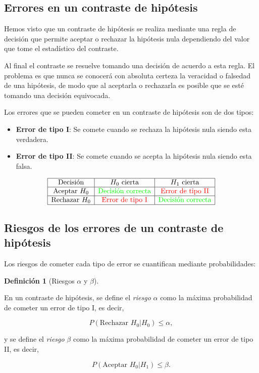 \documentclass[
  a4paper,
]{scrreport}
\theoremstyle{plain}
\theoremstyle{definition}
\theoremstyle{definition}
\newtheorem{definition}{Definición}[chapter]
\theoremstyle{remark}
\begin{document}
\subsection{Errores en un contraste de
hipótesis}\label{errores-en-un-contraste-de-hipuxf3tesis}

Hemos visto que un contraste de hipótesis se realiza mediante una regla
de decisión que permite aceptar o rechazar la hipótesis nula dependiendo
del valor que tome el estadístico del contraste.

Al final el contraste se resuelve tomando una decisión de acuerdo a esta
regla. El problema es que nunca se conocerá con absoluta certeza la
veracidad o falsedad de una hipótesis, de modo que al aceptarla o
rechazarla es posible que se esté tomando una decisión equivocada.

Los errores que se pueden cometer en un contraste de hipótesis son de
dos tipos:

\begin{itemize}
\item
  \textbf{Error de tipo I}: Se comete cuando se rechaza la hipótesis
  nula siendo esta verdadera.
\item
  \textbf{Error de tipo II}: Se comete cuando se acepta la hipótesis
  nula siendo esta falsa.
\end{itemize}

\[
\begin{array}{|c|c|c|}
\hline
\mbox{Decisión} & H_0 \mbox{ cierta} & H_1 \mbox{ cierta} \\
\hline
\mbox{Aceptar } H_0 & \color{green}{\mbox{Decisión correcta}} & \color{red}{\mbox{Error de tipo II}} \\
\hline
\mbox{Rechazar }H_0 & \color{red}{\mbox{Error de tipo I}} & \color{green}{\mbox{Decisión correcta}} \\
\hline
\end{array}
\]

\subsection{Riesgos de los errores de un contraste de
hipótesis}\label{riesgos-de-los-errores-de-un-contraste-de-hipuxf3tesis}

Los riesgos de cometer cada tipo de error se cuantifican mediante
probabilidades:

\begin{definition}[Riesgos \(\alpha\) y
\(\beta\)]\protect\hypertarget{def-riesgos-alfa-beta}{}\label{def-riesgos-alfa-beta}

En un contraste de hipótesis, se define el \emph{riesgo} \(\alpha\) como
la máxima probabilidad de cometer un error de tipo I, es decir,

\[
P(\mbox{Rechazar }H_0|H_0) \leq \alpha,
\]

y se define el \emph{riesgo} \(\beta\) como la máxima probabilidad de
cometer un error de tipo II, es decir,

\[
P(\mbox{Aceptar }H_0|H_1) \leq \beta.
\]

\end{definition}
\end{document}
